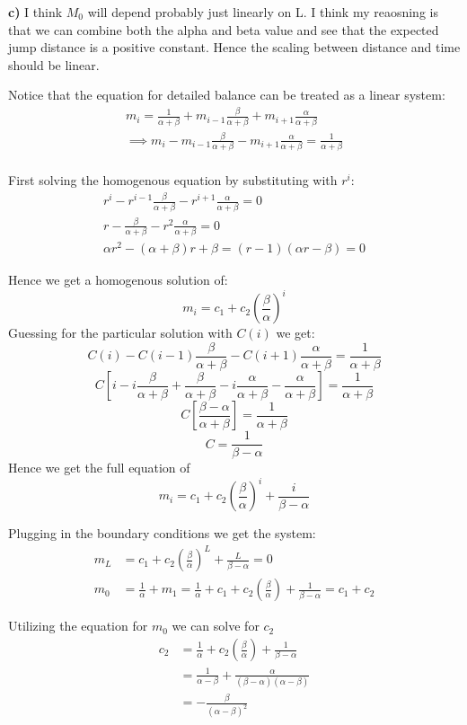 \documentclass{article}
\begin{document}
\textbf{c)}
I think $M_{0}$ will depend probably just linearly on L. I think my reaosning is that
we can combine both the alpha and beta value and see that the expected
jump distance is a positive constant. Hence the scaling between distance and time should be linear.

Notice that the equation for detailed balance can be treated as a linear system:
\begin{align}
m_{i} = \frac{1}{\alpha+\beta} + m_{i-1} \frac{\beta}{\alpha+\beta} + m_{i+1} \frac{\alpha}{\alpha+\beta}\\
\implies m_{i} - m_{i-1} \frac{\beta}{\alpha+\beta} - m_{i+1} \frac{\alpha}{\alpha+\beta} = \frac{1}{\alpha+\beta}\\
\end{align}

First solving the homogenous equation by substituting with $r^{i}$:
\begin{align}
r^{i} - r^{i-1} \frac{\beta}{\alpha+\beta} - r^{i+1} \frac{\alpha}{\alpha+\beta} = 0\\
r -\frac{\beta}{\alpha+\beta} - r^{2} \frac{\alpha}{\alpha+\beta} = 0\\
\alpha r^{2} - (\alpha+\beta)r + \beta= (r-1)(\alpha r-\beta) = 0
\end{align}

Hence we get a homogenous solution of:
\[
m_{i} = c_{1} + c_{2}\left(\frac{\beta}{\alpha}\right)^{i}
\]
Guessing for the particular solution with $C(i)$ we get:
\[
C(i) - C(i-1) \frac{\beta}{\alpha+\beta} - C(i+1) \frac{\alpha}{\alpha+\beta} = \frac{1}{\alpha+\beta}
\]
\[
C\left[i-i\frac{\beta}{\alpha+\beta}+\frac{\beta}{\alpha+\beta}-i\frac{\alpha}{\alpha+\beta}-\frac{\alpha}{\alpha+\beta}\right] = \frac{1}{\alpha+\beta}
\]
\[
C\left[\frac{\beta-\alpha}{\alpha+\beta}\right] = \frac{1}{\alpha+\beta}
\]
\[
C = \frac{1}{\beta-\alpha}
\]
Hence we get the full equation of 
\[
m_{i} = c_{1} + c_{2}\left(\frac{\beta}{\alpha}\right)^{i} + \frac{i}{\beta-\alpha}
\]

Plugging in the boundary conditions we get the system:
\begin{align}
m_{L} &= c_{1} + c_{2}\left(\frac{\beta}{\alpha}\right)^{L} + \frac{L}{\beta-\alpha} = 0\\
m_{0} &= \frac{1}{\alpha} + m_{1} = \frac{1}{\alpha} + c_{1} + c_{2}\left(\frac{\beta}{\alpha}\right) + \frac{1}{\beta-\alpha} = c_{1} + c_{2}
\end{align}

Utilizing the equation for $m_{0}$ we can solve for $c_{2}$
\begin{align}
c_{2} &= \frac{1}{\alpha} + c_{2}\left(\frac{\beta}{\alpha}\right) + \frac{1}{\beta-\alpha}\\
&= \frac{1}{\alpha-\beta} + \frac{\alpha}{(\beta-\alpha)(\alpha-\beta)}\\
&= - \frac{\beta}{(\alpha-\beta)^{2}}
\end{align}
\end{document}

